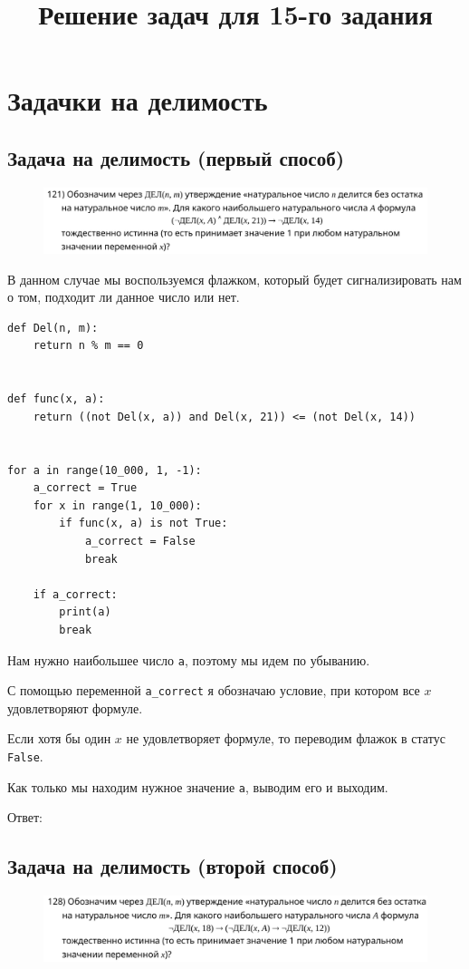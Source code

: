 \documentclass[14pt]{extreport}
\title{Решение задач для 15-го задания}
\date{}
\begin{document}
\maketitle
\tableofcontents

\chapter{Задачки на делимость}
\section{Задача на делимость (первый способ)}
\begin{figure}[h]
	\includegraphics[width=\textwidth]{121-polyakov}
\end{figure}

В данном случае мы воспользуемся флажком, который будет сигнализировать нам о том, подходит ли данное число или нет.

\begin{verbatim}
def Del(n, m):
    return n % m == 0


def func(x, a):
    return ((not Del(x, a)) and Del(x, 21)) <= (not Del(x, 14))


for a in range(10_000, 1, -1):
    a_correct = True
    for x in range(1, 10_000):
        if func(x, a) is not True:
            a_correct = False
            break

    if a_correct:
        print(a)
        break
\end{verbatim}

Нам нужно наибольшее число \texttt{a}, поэтому мы идем по убыванию.

С помощью переменной \texttt{a\_correct} я обозначаю условие, при котором все $x$ удовлетворяют формуле.

Если хотя бы один $x$ не удовлетворяет формуле, то переводим флажок в статус \texttt{False}.

Как только мы находим нужное значение \texttt{a}, выводим его и выходим.

Ответ: 

\newpage
\section{Задача на делимость (второй способ)}
\begin{figure}[h]
    \includegraphics[width=\textwidth]{128-polyakov}
\end{figure}
\end{document}
